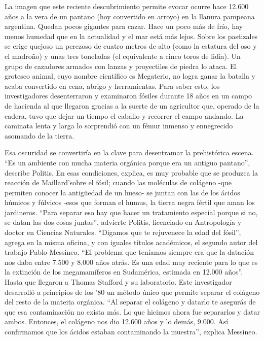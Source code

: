 La imagen que este reciente descubrimiento permite evocar ocurre hace 12.600 años a la vera de un pantano (hoy convertido en arroyo) en la llanura pampeana argentina. Quedan pocos gigantes para cazar. Hace un poco más de frío, hay menos humedad que en la actualidad y el mar está más lejos. Sobre los pastizales se erige quejoso un perezoso de cuatro metros de alto (como la estatura del oso y el madroño) y unas tres toneladas (el equivalente a cinco toros de lidia). Un grupo de cazadores armados con lanzas y proyectiles de piedra lo ataca. El grotesco animal, cuyo nombre científico es Megaterio, no logra ganar la batalla y acaba convertido en cena, abrigo y herramientas. Para saber esto, los investigadores desenterraron y examinaron fósiles durante 18 años en un campo de hacienda al que llegaron gracias a la suerte de un agricultor que, operado de la cadera, tuvo que dejar un tiempo el caballo y recorrer el campo andando. La caminata lenta y larga lo sorprendió con un fémur inmenso y ennegrecido asomando de la tierra.

Esa oscuridad se convertiría en la clave para desentramar la prehistórica escena. ``Es un ambiente con mucha materia orgánica porque era un antiguo pantano'', describe Politis. En esas condiciones, explica, es muy probable que se produzca la reacción de Maillard'sobre el fósil; cuando las moléculas de colágeno -que permiten conocer la antigüedad de un hueso- se juntan con las de los ácidos húmicos y fúlvicos -esos que forman el humus, la tierra negra fértil que aman los jardineros. ``Para separar eso hay que hacer un tratamiento especial porque si no, se datan las dos cosas juntas'', advierte Politis, licenciado en Antropología y doctor en Ciencias Naturales. ``Digamos que te rejuvenece la edad del fósil'', agrega en la misma oficina, y con iguales títulos académicos, el segundo autor del trabajo Pablo Messineo. ``El problema que teníamos siempre era que la datación nos daba entre 7.500 y 8.000 años atrás. Es una edad muy reciente para lo que es la extinción de los megamamíferos en Sudamérica, estimada en 12.000 años''. Hasta que llegaron a Thomas Stafford y su laboratorio. Este investigador desarrolló a principios de los '80 un método único que permite separar el colágeno del resto de la materia orgánica. ``Al separar el colágeno y datarlo te asegurás de que esa contaminación no exista más. Lo que hicimos ahora fue separarlos y datar ambos. Entonces, el colágeno nos dio 12.600 años y lo demás, 9.000. Así confirmamos que los ácidos estaban contaminando la muestra'', explica Messineo.

